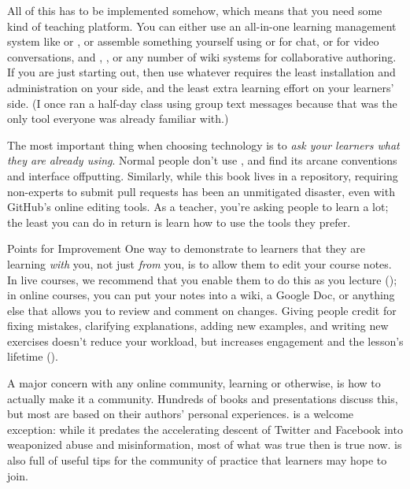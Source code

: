 All of this has to be implemented somehow, which means that you need
some kind of teaching platform. You can either use an all-in-one
learning management system like  or , or
assemble something yourself using  or  for
chat,  or  for
video conversations, and , , or any number of wiki systems for collaborative
authoring. If you are just starting out, then use whatever requires
the least installation and administration on your side, and the least
extra learning effort on your learners' side. (I once ran a half-day
class using group text messages because that was the only tool
everyone was already familiar with.)

The most important thing when choosing technology is to \emph{ask your
learners what they are already using}. Normal people don't use
, and find its arcane conventions and interface
offputting. Similarly, while this book lives in a 
repository, requiring non-experts to submit pull requests has been an
unmitigated disaster, even with GitHub's online editing tools. As a
teacher, you're asking people to learn a lot; the least you can do in
return is learn how to use the tools they prefer.

\begin{aside}{Points for Improvement}
  One way to demonstrate to learners that they are learning \emph{with} you,
  not just \emph{from} you, is to allow them to edit your course notes. In
  live courses, we recommend that you enable them to do this as you
  lecture (); in online courses, you
  can put your notes into a wiki, a Google Doc, or anything else that
  allows you to review and comment on changes. Giving people credit for
  fixing mistakes, clarifying explanations, adding new examples, and
  writing new exercises doesn't reduce your workload, but increases
  engagement and the lesson's lifetime
  ().
\end{aside}

A major concern with any online community, learning or otherwise, is how
to actually make it a community. Hundreds of books and presentations
discuss this, but most are based on their authors' personal experiences.
\cite{Krau2016} is a welcome exception: while it predates the
accelerating descent of Twitter and Facebook into weaponized abuse and
misinformation, most of what was true then is true now.
\cite{Foge2005} is also full of useful tips for the community of
practice that learners may hope to join.

